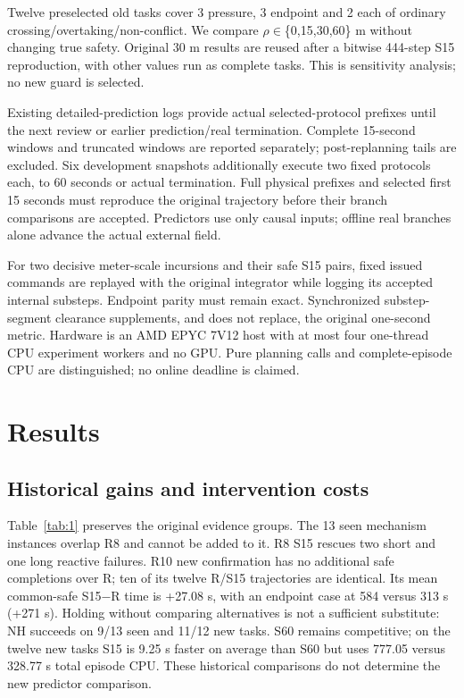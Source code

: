 \documentclass[conference]{IEEEtran}
\begin{document}
Twelve preselected old tasks cover 3 pressure, 3 endpoint and 2 each of ordinary crossing/overtaking/non-conflict. We compare \ensuremath{\rho}\ensuremath{\in}\{0,15,30,60\} m without changing true safety. Original 30 m results are reused after a bitwise 444-step S15 reproduction, with other values run as complete tasks. This is sensitivity analysis; no new guard is selected.

Existing detailed-prediction logs provide actual selected-protocol prefixes until the next review or earlier prediction/real termination. Complete 15-second windows and truncated windows are reported separately; post-replanning tails are excluded. Six development snapshots additionally execute two fixed protocols each, to 60 seconds or actual termination. Full physical prefixes and selected first 15 seconds must reproduce the original trajectory before their branch comparisons are accepted. Predictors use only causal inputs; offline real branches alone advance the actual external field.

For two decisive meter-scale incursions and their safe S15 pairs, fixed issued commands are replayed with the original integrator while logging its accepted internal substeps. Endpoint parity must remain exact. Synchronized substep-segment clearance supplements, and does not replace, the original one-second metric. Hardware is an AMD EPYC 7V12 host with at most four one-thread CPU experiment workers and no GPU. Pure planning calls and complete-episode CPU are distinguished; no online deadline is claimed.

\section{Results}

\subsection{Historical gains and intervention costs}

Table~\ref{tab:1} preserves the original evidence groups. The 13 seen mechanism instances overlap R8 and cannot be added to it. R8 S15 rescues two short and one long reactive failures. R10 new confirmation has no additional safe completions over R; ten of its twelve R/S15 trajectories are identical. Its mean common-safe S15\ensuremath{-}R time is +27.08 s, with an endpoint case at 584 versus 313 s (+271 s). Holding without comparing alternatives is not a sufficient substitute: NH succeeds on 9/13 seen and 11/12 new tasks. S60 remains competitive; on the twelve new tasks S15 is 9.25 s faster on average than S60 but uses 777.05 versus 328.77 s total episode CPU. These historical comparisons do not determine the new predictor comparison.
\end{document}
